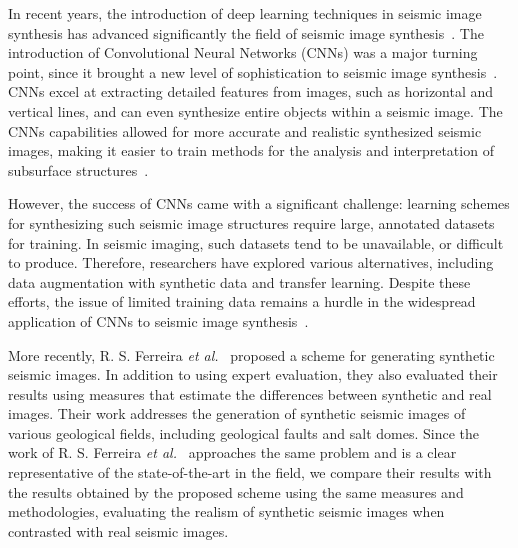 \documentclass{ieeeaccess}
\begin{document}
In recent years, the introduction of deep learning techniques in seismic image synthesis has advanced significantly  the field of seismic image synthesis~\cite{Zeng2019}. The introduction of Convolutional Neural Networks (CNNs) was a major turning point, since it brought a new level of sophistication to seismic image synthesis~\cite{Powers2011}. CNNs excel at extracting detailed features from images, such as horizontal and vertical lines, and can even synthesize entire objects within a seismic image. The CNNs capabilities allowed for more accurate and realistic synthesized seismic images,  making it easier to train methods for the analysis and interpretation of subsurface structures~\cite{Powers2011}. 

However, the success of CNNs came with a significant challenge: learning schemes for synthesizing such seismic image structures require large, annotated datasets for training. In seismic imaging, such datasets tend to be unavailable, or difficult to produce. Therefore, researchers have explored various alternatives, including data augmentation with synthetic data and transfer learning. Despite these efforts, the issue of limited training data remains a hurdle in the widespread application of CNNs to seismic image synthesis~\cite{Wang2021}.

More recently, R. S. Ferreira \emph{et al.}~\cite{Ferreira2020} proposed a scheme for generating synthetic seismic images. In addition to using expert evaluation, they also evaluated their results using measures that estimate the differences between synthetic and real images. Their work addresses the generation of synthetic seismic images of various geological fields, including geological faults and salt domes. Since the work of R. S. Ferreira \emph{et al.}~\cite{Ferreira2020} approaches the same problem and is a clear representative of the state-of-the-art in the field, we compare their results with the results obtained by the proposed scheme using the same measures and methodologies, evaluating the realism of synthetic seismic images when contrasted with real seismic images.
\end{document}
